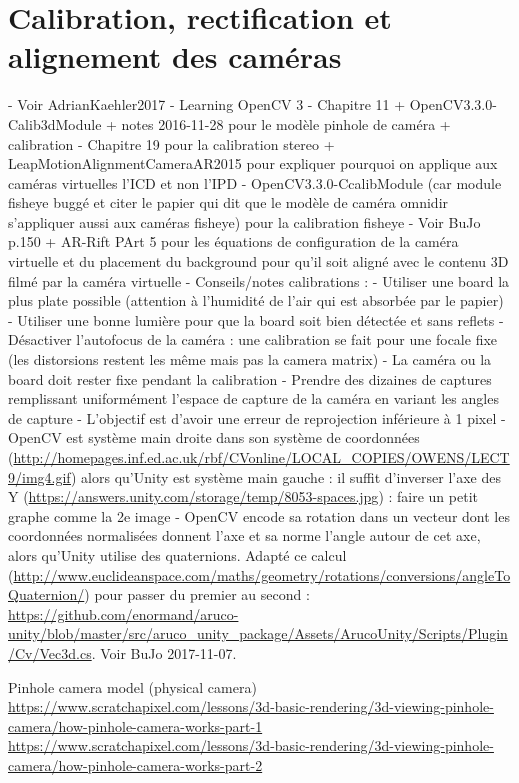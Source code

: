 \section{Calibration, rectification et alignement des caméras}
- Voir AdrianKaehler2017 - Learning OpenCV 3
  - Chapitre 11 + OpenCV3.3.0-Calib3dModule + notes 2016-11-28 pour le modèle pinhole de caméra + calibration
  - Chapitre 19 pour la calibration stereo + LeapMotionAlignmentCameraAR2015 pour expliquer pourquoi on applique aux caméras virtuelles l'ICD et non l'IPD
  - OpenCV3.3.0-CcalibModule (car module fisheye buggé et citer le papier qui dit que le modèle de caméra omnidir s'appliquer aussi aux caméras fisheye) pour la calibration fisheye
- Voir BuJo p.150 + AR-Rift PArt 5 pour les équations de configuration de la caméra virtuelle et du placement du background pour qu'il soit aligné avec le contenu 3D filmé par la caméra virtuelle
- Conseils/notes calibrations :
  - Utiliser une board la plus plate possible (attention à l'humidité de l'air qui est absorbée par le papier)
  - Utiliser une bonne lumière pour que la board soit bien détectée et sans reflets
  - Désactiver l'autofocus de la caméra : une calibration se fait pour une focale fixe (les distorsions restent les même mais pas la camera matrix)
  - La caméra ou la board doit rester fixe pendant la calibration
  - Prendre des dizaines de captures remplissant uniformément l'espace de capture de la caméra en variant les angles de capture
  - L'objectif est d'avoir une erreur de reprojection inférieure à 1 pixel
  - OpenCV est système main droite dans son système de coordonnées (\url{http://homepages.inf.ed.ac.uk/rbf/CVonline/LOCAL_COPIES/OWENS/LECT9/img4.gif}) alors qu'Unity est système main gauche : il suffit d'inverser l'axe des Y (\url{https://answers.unity.com/storage/temp/8053-spaces.jpg}) : faire un petit graphe comme la 2e image
  - OpenCV encode sa rotation dans un vecteur dont les coordonnées normalisées donnent l'axe et sa norme l'angle autour de cet axe, alors qu'Unity utilise des quaternions. Adapté ce calcul (\url{http://www.euclideanspace.com/maths/geometry/rotations/conversions/angleToQuaternion/}) pour passer du premier au second : \url{https://github.com/enormand/aruco-unity/blob/master/src/aruco_unity_package/Assets/ArucoUnity/Scripts/Plugin/Cv/Vec3d.cs}. Voir BuJo 2017-11-07.

Pinhole camera model (physical camera)\\
\url{https://www.scratchapixel.com/lessons/3d-basic-rendering/3d-viewing-pinhole-camera/how-pinhole-camera-works-part-1}\\
\url{https://www.scratchapixel.com/lessons/3d-basic-rendering/3d-viewing-pinhole-camera/how-pinhole-camera-works-part-2}

